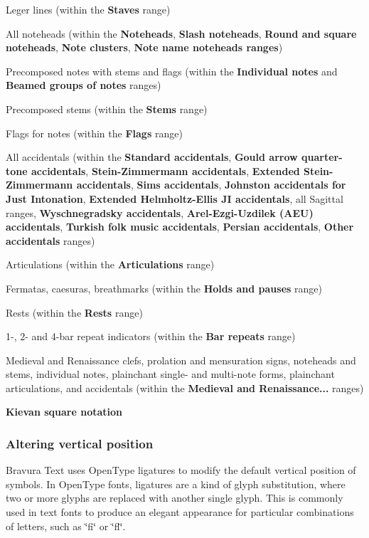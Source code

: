 \begin{DoxyItemize}
\item Leger lines (within the {\bfseries Staves} range)
\item All noteheads (within the {\bfseries Noteheads}, {\bfseries Slash noteheads}, {\bfseries Round and square noteheads}, {\bfseries Note clusters}, {\bfseries Note name noteheads ranges})
\item Precomposed notes with stems and flags (within the {\bfseries Individual notes} and {\bfseries Beamed groups of notes} ranges)
\item Precomposed stems (within the {\bfseries Stems} range)
\item Flags for notes (within the {\bfseries Flags} range)
\item All accidentals (within the {\bfseries Standard accidentals}, {\bfseries Gould arrow quarter-\/tone accidentals}, {\bfseries Stein-\/\+Zimmermann accidentals}, {\bfseries Extended Stein-\/\+Zimmermann accidentals}, {\bfseries Sims accidentals}, {\bfseries Johnston accidentals for Just Intonation}, {\bfseries Extended Helmholtz-\/\+Ellis JI accidentals}, all Sagittal ranges, {\bfseries Wyschnegradsky accidentals}, {\bfseries Arel-\/\+Ezgi-\/\+Uzdilek (A\+EU) accidentals}, {\bfseries Turkish folk music accidentals}, {\bfseries Persian accidentals}, {\bfseries Other accidentals} ranges)
\item Articulations (within the {\bfseries Articulations} range)
\item Fermatas, caesuras, breathmarks (within the {\bfseries Holds and pauses} range)
\item Rests (within the {\bfseries Rests} range)
\item 1-\/, 2-\/ and 4-\/bar repeat indicators (within the {\bfseries Bar repeats} range)
\item Medieval and Renaissance clefs, prolation and mensuration signs, noteheads and stems, individual notes, plainchant single-\/ and multi-\/note forms, plainchant articulations, and accidentals (within the {\bfseries Medieval and Renaissance...} ranges)
\item {\bfseries Kievan square notation}
\end{DoxyItemize}

\subsubsection*{Altering vertical position}

Bravura Text uses Open\+Type ligatures to modify the default vertical position of symbols. In Open\+Type fonts, ligatures are a kind of glyph substitution, where two or more glyphs are replaced with another single glyph. This is commonly used in text fonts to produce an elegant appearance for particular combinations of letters, such as \char`\"{}fi\char`\"{} or \char`\"{}fl\char`\"{}.

